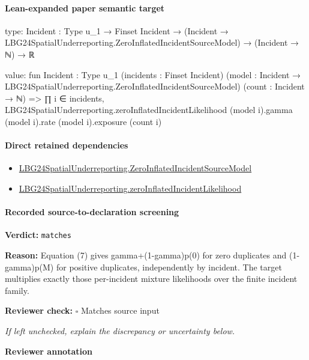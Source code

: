 \documentclass[10pt]{article}
\newcommand{\reviewerbox}{%
  \par\noindent\fbox{\parbox{0.96\linewidth}{\rule{0pt}{0.38in}}}\par
}
\newcommand{\reviewmatch}[1]{%
  \par\noindent\textbf{Reviewer check:} $\square$\; #1\par
  \noindent\emph{If left unchecked, explain the discrepancy or uncertainty below.}\par
}
\begin{document}
\paragraph{Lean-expanded paper semantic target}
\begin{ReviewVerbatim}
type:
{Incident : Type u_1} →
  Finset Incident → (Incident → LBG24SpatialUnderreporting.ZeroInflatedIncidentSourceModel) → (Incident → ℕ) → ℝ

value:
fun {Incident : Type u_1} (incidents : Finset Incident)
    (model : Incident → LBG24SpatialUnderreporting.ZeroInflatedIncidentSourceModel) (count : Incident → ℕ) =>
  ∏ i ∈ incidents,
    LBG24SpatialUnderreporting.zeroInflatedIncidentLikelihood (model i).gamma (model i).rate (model i).exposure
      (count i)
\end{ReviewVerbatim}

\paragraph{Direct retained dependencies}
\begin{itemize}\raggedright
\item \hyperlink{governing-declaration-a3d1dc2c498506a2}{LBG24\allowbreak{}Spatial\allowbreak{}Underreporting.\allowbreak{}Zero\allowbreak{}Inflated\allowbreak{}Incident\allowbreak{}Source\allowbreak{}Model}
\item \hyperlink{governing-declaration-4ea59061d384b2f6}{LBG24\allowbreak{}Spatial\allowbreak{}Underreporting.\allowbreak{}zero\allowbreak{}Inflated\allowbreak{}Incident\allowbreak{}Likelihood}
\end{itemize}
\paragraph{Recorded source-to-declaration screening}
\textbf{Verdict:} \texttt{matches}
\\
{\raggedright
\textbf{Reason:} Equation (7) gives gamma+(1-\allowbreak{}gamma)p(0) for zero duplicates and (1-\allowbreak{}gamma)p(M) for positive duplicates, independently by incident.\allowbreak{} The target multiplies exactly those per-\allowbreak{}incident mixture likelihoods over the finite incident family.\allowbreak{}
\par}
\reviewmatch{Matches source input}
\noindent\textbf{Reviewer annotation}\par
\reviewerbox

\clearpage
\hypertarget{source-claim-ce9253f67ee0c7eb}{}
\hypertarget{source-section-f10b5f68e4acf3dc}{}
\end{document}
